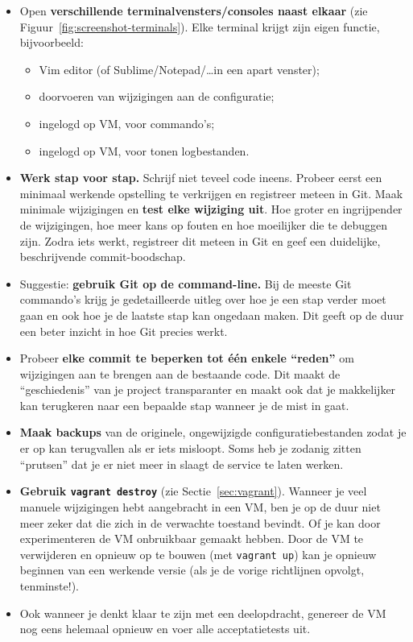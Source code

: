 \begin{itemize}
  \item Open \textbf{verschillende terminalvensters/consoles naast elkaar} (zie Figuur~\ref{fig:screenshot-terminals}). Elke terminal krijgt zijn eigen functie, bijvoorbeeld:
    \begin{itemize}
      \item Vim editor (of Sublime/Notepad/\ldots in een apart venster);
      \item doorvoeren van wijzigingen aan de configuratie;
      \item ingelogd op VM, voor commando's;
      \item ingelogd op VM, voor tonen logbestanden.
    \end{itemize}
  \item \textbf{Werk stap voor stap.} Schrijf niet teveel code ineens. Probeer eerst een minimaal werkende opstelling te verkrijgen en registreer meteen in Git. Maak minimale wijzigingen en \textbf{test elke wijziging uit}. Hoe groter en ingrijpender de wijzigingen, hoe meer kans op fouten en hoe moeilijker die te debuggen zijn. Zodra iets werkt, registreer dit meteen in Git en geef een duidelijke, beschrijvende commit-boodschap.
  \item Suggestie: \textbf{gebruik Git op de command-line.} Bij de meeste Git commando's krijg je gedetailleerde uitleg over hoe je een stap verder moet gaan en ook hoe je de laatste stap kan ongedaan maken. Dit geeft op de duur een beter inzicht in hoe Git precies werkt.
  \item Probeer \textbf{elke commit te beperken tot één enkele ``reden''} om wijzigingen aan te brengen aan de bestaande code. Dit maakt de ``geschiedenis'' van je project transparanter en maakt ook dat je makkelijker kan terugkeren naar een bepaalde stap wanneer je de mist in gaat.
  \item \textbf{Maak backups} van de originele, ongewijzigde configuratiebestanden zodat je er op kan terugvallen als er iets misloopt. Soms heb je zodanig zitten ``prutsen'' dat je er niet meer in slaagt de service te laten werken.
  \item \textbf{Gebruik \texttt{vagrant destroy}} (zie Sectie~\ref{sec:vagrant}). Wanneer je veel manuele wijzigingen hebt aangebracht in een VM, ben je op de duur niet meer zeker dat die zich in de verwachte toestand bevindt. Of je kan door experimenteren de VM onbruikbaar gemaakt hebben. Door de VM te verwijderen en opnieuw op te bouwen (met \texttt{vagrant up}) kan je opnieuw beginnen van een werkende versie (als je de vorige richtlijnen opvolgt, tenminste!).
  \item Ook wanneer je denkt klaar te zijn met een deelopdracht, genereer de VM nog eens helemaal opnieuw en voer alle acceptatietests uit.
\end{itemize}

